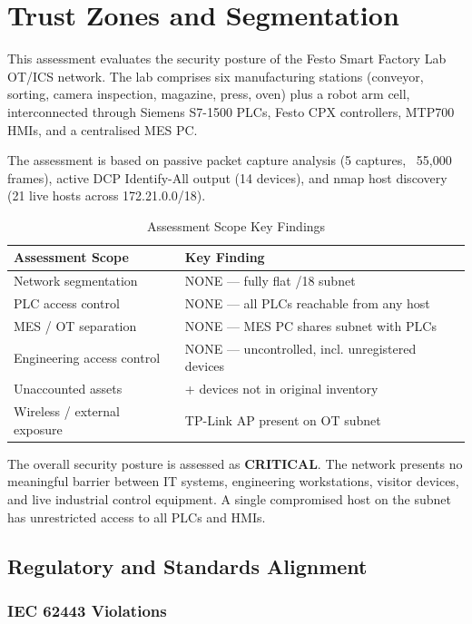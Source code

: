 \section{Trust Zones and Segmentation}

This assessment evaluates the security posture of the Festo Smart Factory Lab OT/ICS network. The lab comprises six manufacturing stations (conveyor, sorting, camera inspection, magazine, press, oven) plus a robot arm cell, interconnected through Siemens S7-1500 PLCs, Festo CPX controllers, MTP700 HMIs, and a centralised MES PC.

The assessment is based on passive packet capture analysis (5 captures, ~55,000 frames), active DCP Identify-All output (14 devices), and nmap host discovery (21 live hosts across 172.21.0.0/18).

\begin{table}[h!]
\centering

\begin{tabular}{@{}l>{\raggedright\arraybackslash}p{}@{}}
\toprule
\textbf{Assessment Scope} & \textbf{Key Finding} \\
\midrule
Network segmentation & NONE — fully flat /18 subnet \\
PLC access control & NONE — all PLCs reachable from any host \\
MES / OT separation & NONE — MES PC shares subnet with PLCs \\
Engineering access control & NONE — uncontrolled, incl. unregistered devices \\
Unaccounted assets & 6+ devices not in original inventory \\
Wireless / external exposure & TP-Link AP present on OT subnet \\
\bottomrule
\end{tabular}
\caption{Assessment Scope Key Findings}
\end{table}

The overall security posture is assessed as \textbf{CRITICAL}. The network presents no meaningful barrier between IT systems, engineering workstations, visitor devices, and live industrial control equipment. A single compromised host on the subnet has unrestricted access to all PLCs and HMIs.

\subsection{Regulatory and Standards Alignment}

\subsubsection{IEC 62443 Violations}

